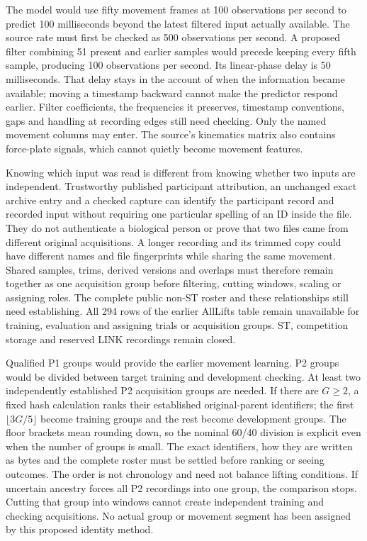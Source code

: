 The model would use fifty movement frames at 100 observations per second to predict 100 milliseconds beyond the latest filtered input actually available. The source rate must first be checked as 500 observations per second. A proposed filter combining 51 present and earlier samples would precede keeping every fifth sample, producing 100 observations per second. Its linear-phase delay is 50 milliseconds. That delay stays in the account of when the information became available; moving a timestamp backward cannot make the predictor respond earlier. Filter coefficients, the frequencies it preserves, timestamp conventions, gaps and handling at recording edges still need checking. Only the named movement columns may enter. The source's kinematics matrix also contains force-plate signals, which cannot quietly become movement features.

Knowing which input was read is different from knowing whether two inputs are independent. Trustworthy published participant attribution, an unchanged exact archive entry and a checked capture can identify the participant record and recorded input without requiring one particular spelling of an ID inside the file. They do not authenticate a biological person or prove that two files came from different original acquisitions. A longer recording and its trimmed copy could have different names and file fingerprints while sharing the same movement. Shared samples, trims, derived versions and overlaps must therefore remain together as one acquisition group before filtering, cutting windows, scaling or assigning roles. The complete public non-ST roster and these relationships still need establishing. All 294 rows of the earlier AllLifts table remain unavailable for training, evaluation and assigning trials or acquisition groups. ST, competition storage and reserved LINK recordings remain closed.

Qualified P1 groups would provide the earlier movement learning. P2 groups would be divided between target training and development checking. At least two independently established P2 acquisition groups are needed. If there are $G\geq2$, a fixed hash calculation ranks their established original-parent identifiers; the first $\lfloor3G/5\rfloor$ become training groups and the rest become development groups. The floor brackets mean rounding down, so the nominal 60/40 division is explicit even when the number of groups is small. The exact identifiers, how they are written as bytes and the complete roster must be settled before ranking or seeing outcomes. The order is not chronology and need not balance lifting conditions. If uncertain ancestry forces all P2 recordings into one group, the comparison stops. Cutting that group into windows cannot create independent training and checking acquisitions. No actual group or movement segment has been assigned by this proposed identity method.

